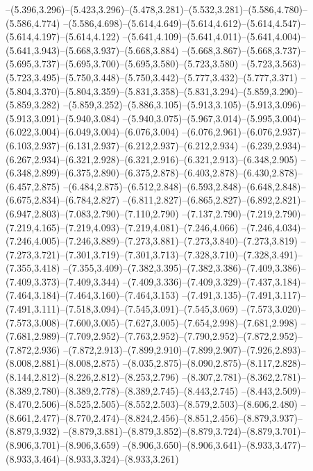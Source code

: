   --(5.396,3.296)--(5.423,3.296)--(5.478,3.281)--(5.532,3.281)--(5.586,4.780)--(5.586,4.774)%
  --(5.586,4.698)--(5.614,4.649)--(5.614,4.612)--(5.614,4.547)--(5.614,4.197)--(5.614,4.122)%
  --(5.641,4.109)--(5.641,4.011)--(5.641,4.004)--(5.641,3.943)--(5.668,3.937)--(5.668,3.884)%
  --(5.668,3.867)--(5.668,3.737)--(5.695,3.737)--(5.695,3.700)--(5.695,3.580)--(5.723,3.580)%
  --(5.723,3.563)--(5.723,3.495)--(5.750,3.448)--(5.750,3.442)--(5.777,3.432)--(5.777,3.371)%
  --(5.804,3.370)--(5.804,3.359)--(5.831,3.358)--(5.831,3.294)--(5.859,3.290)--(5.859,3.282)%
  --(5.859,3.252)--(5.886,3.105)--(5.913,3.105)--(5.913,3.096)--(5.913,3.091)--(5.940,3.084)%
  --(5.940,3.075)--(5.967,3.014)--(5.995,3.004)--(6.022,3.004)--(6.049,3.004)--(6.076,3.004)%
  --(6.076,2.961)--(6.076,2.937)--(6.103,2.937)--(6.131,2.937)--(6.212,2.937)--(6.212,2.934)%
  --(6.239,2.934)--(6.267,2.934)--(6.321,2.928)--(6.321,2.916)--(6.321,2.913)--(6.348,2.905)%
  --(6.348,2.899)--(6.375,2.890)--(6.375,2.878)--(6.403,2.878)--(6.430,2.878)--(6.457,2.875)%
  --(6.484,2.875)--(6.512,2.848)--(6.593,2.848)--(6.648,2.848)--(6.675,2.834)--(6.784,2.827)%
  --(6.811,2.827)--(6.865,2.827)--(6.892,2.821)--(6.947,2.803)--(7.083,2.790)--(7.110,2.790)%
  --(7.137,2.790)--(7.219,2.790)--(7.219,4.165)--(7.219,4.093)--(7.219,4.081)--(7.246,4.066)%
  --(7.246,4.034)--(7.246,4.005)--(7.246,3.889)--(7.273,3.881)--(7.273,3.840)--(7.273,3.819)%
  --(7.273,3.721)--(7.301,3.719)--(7.301,3.713)--(7.328,3.710)--(7.328,3.491)--(7.355,3.418)%
  --(7.355,3.409)--(7.382,3.395)--(7.382,3.386)--(7.409,3.386)--(7.409,3.373)--(7.409,3.344)%
  --(7.409,3.336)--(7.409,3.329)--(7.437,3.184)--(7.464,3.184)--(7.464,3.160)--(7.464,3.153)%
  --(7.491,3.135)--(7.491,3.117)--(7.491,3.111)--(7.518,3.094)--(7.545,3.091)--(7.545,3.069)%
  --(7.573,3.020)--(7.573,3.008)--(7.600,3.005)--(7.627,3.005)--(7.654,2.998)--(7.681,2.998)%
  --(7.681,2.989)--(7.709,2.952)--(7.763,2.952)--(7.790,2.952)--(7.872,2.952)--(7.872,2.936)%
  --(7.872,2.913)--(7.899,2.910)--(7.899,2.907)--(7.926,2.893)--(8.008,2.881)--(8.008,2.875)%
  --(8.035,2.875)--(8.090,2.875)--(8.117,2.828)--(8.144,2.812)--(8.226,2.812)--(8.253,2.796)%
  --(8.307,2.781)--(8.362,2.781)--(8.389,2.780)--(8.389,2.778)--(8.389,2.745)--(8.443,2.745)%
  --(8.443,2.509)--(8.470,2.506)--(8.525,2.505)--(8.552,2.503)--(8.579,2.503)--(8.606,2.480)%
  --(8.661,2.477)--(8.770,2.474)--(8.824,2.456)--(8.851,2.456)--(8.879,3.937)--(8.879,3.932)%
  --(8.879,3.881)--(8.879,3.852)--(8.879,3.724)--(8.879,3.701)--(8.906,3.701)--(8.906,3.659)%
  --(8.906,3.650)--(8.906,3.641)--(8.933,3.477)--(8.933,3.464)--(8.933,3.324)--(8.933,3.261)%
